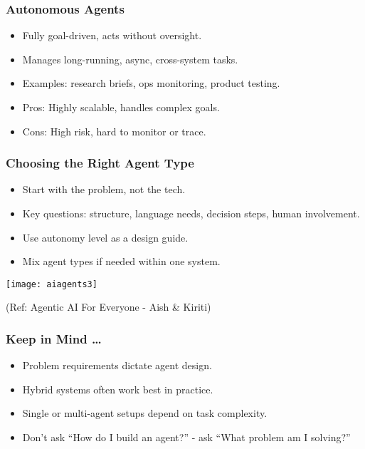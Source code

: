 \begin{frame}[fragile]\frametitle{Autonomous Agents}
    \begin{itemize}
        \item Fully goal-driven, acts without oversight.
        \item Manages long-running, async, cross-system tasks.
        \item Examples: research briefs, ops monitoring, product testing.
        \item Pros: Highly scalable, handles complex goals.
        \item Cons: High risk, hard to monitor or trace.
    \end{itemize}
\end{frame}

\begin{frame}[fragile]\frametitle{Choosing the Right Agent Type}
    \begin{itemize}
        \item Start with the problem, not the tech.
        \item Key questions: structure, language needs, decision steps, human involvement.
        \item Use autonomy level as a design guide.
        \item Mix agent types if needed within one system.
    \end{itemize}
	
        \begin{center}
        \texttt{[image: aiagents3]}
		
		{\tiny (Ref: Agentic AI For Everyone - Aish \& Kiriti)}
        \end{center}
		
\end{frame}

\begin{frame}[fragile]\frametitle{Keep in Mind \ldots}
    \begin{itemize}
        \item Problem requirements dictate agent design.
        \item Hybrid systems often work best in practice.
        \item Single or multi-agent setups depend on task complexity.
        \item Don't ask “How do I build an agent?” - ask “What problem am I solving?”
    \end{itemize}
\end{frame}


